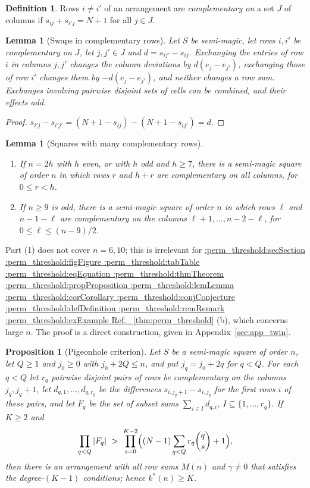 \documentclass[11pt,a4paper]{article}
\makeatletter
\def\Cref@getprefix#1:#2\relax{#1}
\def\Cref@prefix@sec{sec}
\def\Cref@prefix@fig{fig}
\def\Cref@prefix@tab{tab}
\def\Cref@prefix@eq{eq}
\def\Cref@prefix@thm{thm}
\def\Cref@prefix@prop{prop}
\def\Cref@prefix@lem{lem}
\def\Cref@prefix@cor{cor}
\def\Cref@prefix@conj{conj}
\def\Cref@prefix@def{def}
\def\Cref@prefix@rem{rem}
\def\Cref@prefix@ex{ex}
\def\Cref@type@cap#1{%
  \edef\Cref@tmp{#1}%
  \ifx\Cref@tmp\Cref@prefix@sec Section%
  \else\ifx\Cref@tmp\Cref@prefix@fig Figure%
  \else\ifx\Cref@tmp\Cref@prefix@tab Table%
  \else\ifx\Cref@tmp\Cref@prefix@eq Equation%
  \else\ifx\Cref@tmp\Cref@prefix@thm Theorem%
  \else\ifx\Cref@tmp\Cref@prefix@prop Proposition%
  \else\ifx\Cref@tmp\Cref@prefix@lem Lemma%
  \else\ifx\Cref@tmp\Cref@prefix@cor Corollary%
  \else\ifx\Cref@tmp\Cref@prefix@conj Conjecture%
  \else\ifx\Cref@tmp\Cref@prefix@def Definition%
  \else\ifx\Cref@tmp\Cref@prefix@rem Remark%
  \else\ifx\Cref@tmp\Cref@prefix@ex Example%
  \else Ref.%
  \fi\fi\fi\fi\fi\fi\fi\fi\fi\fi\fi\fi
}
\DeclareRobustCommand{\Cref}[1]{%
  \begingroup
  \edef\Cref@label{#1}%
  \edef\Cref@prefix{\expandafter\Cref@getprefix\Cref@label:\relax}%
  \hyperref[#1]{\Cref@type@cap{\Cref@prefix}~\ref*{#1}}%
  \endgroup
}
\theoremstyle{plain}
\newtheorem{lemma}[theorem]{Lemma}
\newtheorem{proposition}[theorem]{Proposition}
\theoremstyle{definition}
\newtheorem{definition}[theorem]{Definition}
\theoremstyle{remark}
\makeatother
\begin{document}
\begin{definition}
Rows $i\ne i'$ of an arrangement are \emph{complementary on} a set $J$ of columns if $s_{ij}+s_{i'j}=N+1$ for all $j\in J$.
\end{definition}

\begin{lemma}[Swaps in complementary rows]
\label{lem:twin}
Let $S$ be semi-magic, let rows $i,i'$ be complementary on $J$, let $j,j'\in J$ and $d=s_{ij'}-s_{ij}$.
Exchanging the entries of row $i$ in columns $j,j'$ changes the column deviations by $d(e_j-e_{j'})$, exchanging those of row $i'$ changes them by $-d(e_j-e_{j'})$, and neither changes a row sum.
Exchanges involving pairwise disjoint sets of cells can be combined, and their effects add.
\end{lemma}

\begin{proof}
$s_{i'j}-s_{i'j'}=(N+1-s_{ij})-(N+1-s_{ij'})=d$.
\end{proof}

\begin{lemma}[Squares with many complementary rows]
\label{lem:twin_squares}
\leavevmode
\begin{enumerate}
\item If $n=2h$ with $h$ even, or with $h$ odd and $h\ge7$, there is a semi-magic square of order $n$ in which rows $r$ and $h+r$ are complementary on all columns, for $0\le r<h$.
\item If $n\ge9$ is odd, there is a semi-magic square of order $n$ in which rows $\ell$ and $n-1-\ell$ are complementary on the columns $\ell+1,\dots,n-2-\ell$, for $0\le\ell\le(n-9)/2$.
\end{enumerate}
\end{lemma}

Part (1) does not cover $n=6,10$; this is irrelevant for \Cref{thm:perm_threshold}(b), which concerns large $n$.
The proof is a direct construction, given in Appendix~\ref{sec:app_twin}.

\begin{proposition}[Pigeonhole criterion]
\label{prop:box}
Let $S$ be a semi-magic square of order $n$, let $Q\ge1$ and $j_0\ge0$ with $j_0+2Q\le n$, and put $j_q=j_0+2q$ for $q<Q$.
For each $q<Q$ let $r_q$ pairwise disjoint pairs of rows be complementary on the columns $j_q,j_q+1$, let $d_{q,1},\dots,d_{q,r_q}$ be the differences $s_{i,j_q+1}-s_{i,j_q}$ for the first rows $i$ of these pairs, and let $F_q$ be the set of subset sums $\sum_{i\in I}d_{q,i}$, $I\subseteq\{1,\dots,r_q\}$.
If $K\ge2$ and
\begin{equation}
\prod_{q<Q}|F_q|\ >\ \prod_{s=0}^{K-2}\Bigl((N-1)\sum_{q<Q}r_q\binom qs+1\Bigr),
\label{eq:box}
\end{equation}
then there is an arrangement with all row sums $M(n)$ and $\gamma\ne0$ that satisfies the degree-$(K-1)$ conditions; hence $k^*(n)\ge K$.
\end{proposition}
\end{document}
